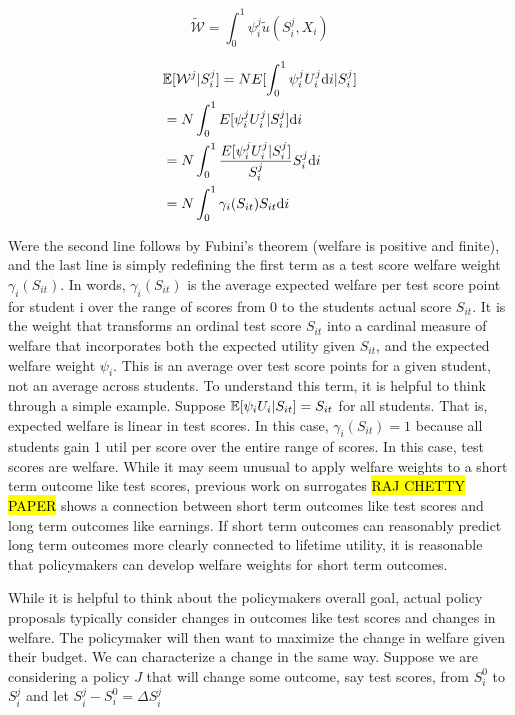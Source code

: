 \documentclass[12pt]{article}
\theoremstyle{definition}
\theoremstyle{definition}
\theoremstyle{definition}
\theoremstyle{definition}
\begin{document}
\[
\tilde{\mathcal{W}} = \int_0^1 \psi^j_i \tilde{u}(S^j_i,X_i) 
\]

  
    \begin{align}
           & \mathbb{E}[\mathcal{W}^j|S_i^j] = N E[\int_0^1 \psi^j_i U^j_i \text{d}i|S_i^j] \\
           & = N \int_0^1 E[\psi^j_i U^j_i |S_i^j] \text{d}i \\ 
           &  = N \int_0^1 \frac{E[\psi^j_i U^j_i |S_i^j]}{S_i^j} S_i^j\text{d}i \\ 
          &   = N \int_0^1 \gamma_i(S_{it}) S_{it} \text{d}i
    \end{align}

   Were the second line follows by Fubini's theorem (welfare is positive and finite), and the last line is simply redefining the first term as a test score welfare weight $\gamma_i(S_{it})$. In words, $\gamma_i(S_{it})$  is the average expected welfare per test score point for student i over the range of scores from 0 to the students actual score $S_{it}$. It is the weight that transforms an ordinal test score $S_{it}$ into a cardinal measure of welfare that incorporates both the expected utility given $S_{it}$, and the expected welfare weight $\psi_i$. This is an average over test score points for a given student, not an average across students. To understand this term, it is helpful to think through a simple example. Suppose  $ \mathbb{E}[ \psi_i U_{i} |S_{it}]= S_{it}$ for all students. That is, expected welfare is linear in test scores. In this case,  $\gamma_i(S_{it}) = 1$ because all students gain 1 util per score over the entire range of scores. In this case, test scores are welfare. While it may seem unusual to apply welfare weights to a short term outcome like test scores, previous work on surrogates \hl{RAJ CHETTY PAPER} shows a connection between short term outcomes like test scores and long term outcomes like earnings. If short term outcomes can reasonably predict long term outcomes more clearly connected to lifetime utility, it is reasonable that policymakers can develop welfare weights for short term outcomes. 

   While it is helpful to think about the policymakers overall goal, actual policy proposals typically consider changes in outcomes like test scores and changes in welfare. The policymaker will then want to maximize the change in welfare given their budget. We can characterize a change in the same way. Suppose we are considering a policy $J$ that will change some outcome, say test scores, from $S_i^0$ to $S_i^j$ and let $S_i^j- S_i^0 = \Delta S^j_i$
\end{document}

